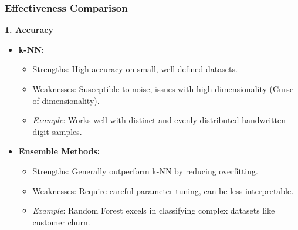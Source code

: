 \documentclass[aspectratio=169]{beamer}
\begin{document}
\begin{frame}[fragile]
    \frametitle{Effectiveness Comparison}

    \textbf{1. Accuracy}
    \begin{itemize}
        \item \textbf{k-NN:}
        \begin{itemize}
            \item Strengths: High accuracy on small, well-defined datasets.
            \item Weaknesses: Susceptible to noise, issues with high dimensionality (Curse of dimensionality).
            \item \textit{Example}: Works well with distinct and evenly distributed handwritten digit samples.
        \end{itemize}

        \item \textbf{Ensemble Methods:} 
        \begin{itemize}
            \item Strengths: Generally outperform k-NN by reducing overfitting.
            \item Weaknesses: Require careful parameter tuning, can be less interpretable.
            \item \textit{Example}: Random Forest excels in classifying complex datasets like customer churn.
        \end{itemize}
    \end{itemize}
\end{frame}
\end{document}
